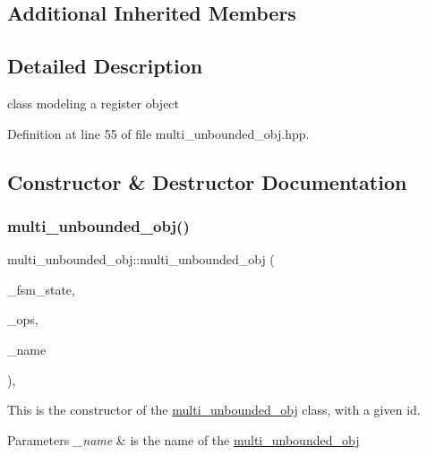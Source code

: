 \subsection*{Additional Inherited Members}


\subsection{Detailed Description}
class modeling a register object 

Definition at line 55 of file multi\+\_\+unbounded\+\_\+obj.\+hpp.



\subsection{Constructor \& Destructor Documentation}
\mbox{\label{classmulti__unbounded__obj_a38f08a84f08beb0c7d1860bd9bd29812}} 
\subsubsection{\texorpdfstring{multi\+\_\+unbounded\+\_\+obj()}{multi\_unbounded\_obj()}}
{\footnotesize\ttfamily multi\+\_\+unbounded\+\_\+obj\+::multi\+\_\+unbounded\+\_\+obj (\begin{DoxyParamCaption}\item[{\hyperlink{graph_8hpp_abefdcf0544e601805af44eca032cca14}{vertex}}]{\+\_\+fsm\+\_\+state,  }\item[{const \hyperlink{classCustomOrderedSet}{Custom\+Ordered\+Set}$<$ \hyperlink{graph_8hpp_abefdcf0544e601805af44eca032cca14}{vertex} $>$ \&}]{\+\_\+ops,  }\item[{const std\+::string \&}]{\+\_\+name }\end{DoxyParamCaption})\hspace{0.3cm}{\ttfamily [inline]}, {\ttfamily [explicit]}}



This is the constructor of the \hyperlink{classmulti__unbounded__obj}{multi\+\_\+unbounded\+\_\+obj} class, with a given id. 


\begin{DoxyParams}{Parameters}
{\em \+\_\+name} & is the name of the \hyperlink{classmulti__unbounded__obj}{multi\+\_\+unbounded\+\_\+obj} \\
\hline
\end{DoxyParams}


